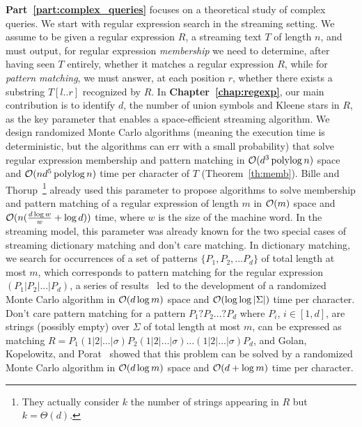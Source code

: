 \textbf{Part~\ref{part:complex_queries}} focuses on a theoretical study of complex queries. 
%
We start with regular expression search in the streaming setting.
%
We assume to be given a regular expression $R$, a streaming text $T$ of length $n$, and must output, for regular expression \emph{membership} we need to determine, after having seen $T$ entirely, whether it matches a regular expression $R$, while for \emph{pattern matching}, we must answer, at each position $r$, whether there exists a substring $T[l..r]$ recognized by $R$.
In \textbf{Chapter~\ref{chap:regexp}}, our main contribution is to identify $d$, the number of union symbols and Kleene stars in $R$, as the key parameter that enables a space-efficient streaming algorithm. We design randomized Monte Carlo algorithms (meaning the execution time is deterministic, but the algorithms can err with a small probability) that solve regular expression membership and pattern matching in $\mathcal{O}(d^3\operatorname{polylog} n)$ space and $\mathcal{O}(nd^5\operatorname{polylog} n)$ time per character of $T$ (Theorem~\ref{th:memb}).
Bille and Thorup~\cite{doi:10.1137/1.9781611973075.104}\footnote{They actually consider $k$ the number of strings appearing in $R$ but $k=\Theta(d)$.} already used this parameter to propose algorithms to solve membership and pattern matching of a regular expression of length $m$ in $\mathcal{O}(m)$ space and $\mathcal{O}(n(\frac{d\log w}{w} + \log d))$ time, where $w$ is the size of the machine word.
In the streaming model, this parameter was already known for the two special cases of streaming dictionary matching and don't care matching. In dictionary matching, we search for occurrences of a set of patterns $\{P_1, P_2, ... P_d \}$ of total length at most $m$, which corresponds to pattern matching for the regular expression $(P_1| P_2| ... | P_d)$, a series of results~\cite{Porat:09,DBLP:journals/talg/BreslauerG14,DBLP:conf/esa/CliffordFPSS15,DBLP:conf/esa/GolanP17,DBLP:conf/icalp/GolanKP18} led to the development of a randomized Monte Carlo algorithm in $\mathcal{O}(d\log m)$ space and $\mathcal{O}(\log \log |\Sigma|)$ time per character.
Don't care pattern matching for a pattern $P_1 ? P_2 ... ? P_d$ where $P_i$, $i \in [1,d]$, are strings (possibly empty) over $\Sigma$ of total length at most $m$, can be expressed as matching $R = P_1 (1|2|\ldots|\sigma) P_2 (1|2|\ldots|\sigma) \ldots (1|2|\ldots|\sigma) P_{d}$, and Golan, Kopelowitz, and Porat~\cite{DBLP:journals/algorithmica/GolanKP19} showed that this problem can be solved by a randomized Monte Carlo algorithm in $\mathcal{O}(d \log m)$ space and $\mathcal{O}(d+\log m)$ time per character.

